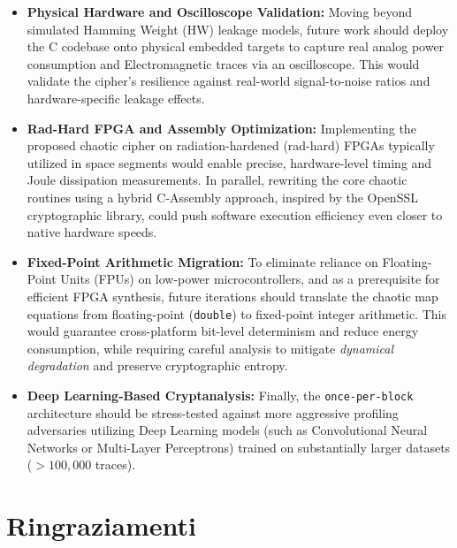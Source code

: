 \documentclass[11pt,a4paper]{report}
\begin{document}
\begin{itemize}
    \item \textbf{Physical Hardware and Oscilloscope Validation:} Moving beyond simulated Hamming Weight (HW) leakage models, future work should deploy the C codebase onto physical embedded targets to capture real analog power consumption and Electromagnetic traces via an oscilloscope. 
    This would validate the cipher's resilience against real-world signal-to-noise ratios and hardware-specific leakage effects.

    \item \textbf{Rad-Hard FPGA and Assembly Optimization:} Implementing the proposed chaotic cipher on radiation-hardened (rad-hard) FPGAs typically utilized in space segments would enable precise, 
    hardware-level timing and Joule dissipation measurements. In parallel, rewriting the core chaotic routines using a hybrid C-Assembly approach, inspired by the OpenSSL cryptographic library, could push software execution efficiency even closer to native hardware speeds.

    \item \textbf{Fixed-Point Arithmetic Migration:} To eliminate reliance on Floating-Point Units (FPUs) on low-power microcontrollers, and as a prerequisite for efficient FPGA synthesis, 
    future iterations should translate the chaotic map equations from floating-point (\texttt{double}) to fixed-point integer arithmetic. 
    This would guarantee cross-platform bit-level determinism and reduce energy consumption, while requiring careful analysis to mitigate \textit{dynamical degradation} and preserve cryptographic entropy.
    
    \item \textbf{Deep Learning-Based Cryptanalysis:} Finally, the \texttt{once-per-block} architecture should be stress-tested against more aggressive profiling adversaries utilizing Deep Learning models (such as Convolutional Neural Networks or Multi-Layer Perceptrons) trained on substantially larger datasets ($>100,000$ traces).
\end{itemize}


\newpage
\printbibliography[heading=bibintoc, title={Bibliography}]

\cleardoublepage
\chapter*{Ringraziamenti}
\thispagestyle{empty}
\end{document}
